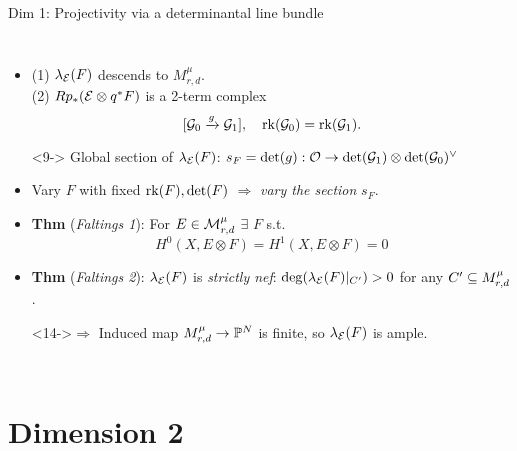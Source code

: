 \documentclass[8pt,handout]{beamer} %
\begin{document}
\begin{frame}[fragile]{Dim 1: Projectivity via a determinantal line bundle}
\begin{columns}[t]
    \begin{itemize}
        \item<8-> (1) $\lambda_{\mathcal{E}}(F)$ descends to $M^\mu_{r,d}$. \\ (2) $R p_* (\mathcal{E} \otimes q^*F)$ is a 2-term complex
        \[ [\mathcal{G}_0 \xrightarrow{g} \mathcal{G}_1], \quad \operatorname{\mathrm{rk}}(\mathcal{G}_0) = \operatorname{\mathrm{rk}}(\mathcal{G}_1). \]
        \item[]<9-> Global section of $\lambda_{\mathcal{E}}(F)$: $s_F = \det(g): \mathcal{O} \to \det(\mathcal{G}_1) \otimes \det(\mathcal{G}_0)^\vee$
        \item<10-> Vary $F$ with fixed $\operatorname{\mathrm{rk}}(F), \det(F)$ $\Rightarrow$ \textit{vary the section} $s_F$.
        \item<11-> \textbf{Thm} (\textit{Faltings 1}): For $E \in \mathcal{M}^\mu_{r,d}$ $\exists$ $F$ s.t.
        \[ H^0(X, E \otimes F) = H^1(X, E \otimes F) = 0 \]
        \item<13-> \textbf{Thm} (\textit{Faltings 2}): $\lambda_{\mathcal{E}}(F)$ is \textit{strictly nef}: $\deg(\lambda_{\mathcal{E}}(F)|_{C'}) > 0$ for any $C' \subseteq M^\mu_{r,d}$.
        \item[]<14->$\Rightarrow$ Induced map $M^\mu_{r,d} \to \mathbb{P}^N$ is finite, so $\lambda_{\mathcal{E}}(F)$ is ample.
    \end{itemize}
\end{columns}
\end{frame}

\section{Dimension 2}
\end{document}
